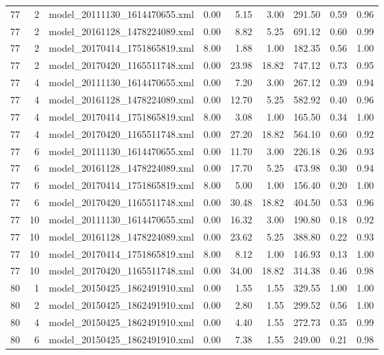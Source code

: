 \begin{table}[ht]
\begin{tabular}{rrlrrrrrr}
   77 &   2 & model\_20111130\_1614470655.xml & 0.00 & 5.15 & 3.00 & 291.50 & 0.59 & 0.96 \\ 
   77 &   2 & model\_20161128\_1478224089.xml & 0.00 & 8.82 & 5.25 & 691.12 & 0.60 & 0.99 \\ 
   77 &   2 & model\_20170414\_1751865819.xml & 8.00 & 1.88 & 1.00 & 182.35 & 0.56 & 1.00 \\ 
   77 &   2 & model\_20170420\_1165511748.xml & 0.00 & 23.98 & 18.82 & 747.12 & 0.73 & 0.95 \\ 
   77 &   4 & model\_20111130\_1614470655.xml & 0.00 & 7.20 & 3.00 & 267.12 & 0.39 & 0.94 \\ 
   77 &   4 & model\_20161128\_1478224089.xml & 0.00 & 12.70 & 5.25 & 582.92 & 0.40 & 0.96 \\ 
   77 &   4 & model\_20170414\_1751865819.xml & 8.00 & 3.08 & 1.00 & 165.50 & 0.34 & 1.00 \\ 
   77 &   4 & model\_20170420\_1165511748.xml & 0.00 & 27.20 & 18.82 & 564.10 & 0.60 & 0.92 \\ 
   77 &   6 & model\_20111130\_1614470655.xml & 0.00 & 11.70 & 3.00 & 226.18 & 0.26 & 0.93 \\ 
   77 &   6 & model\_20161128\_1478224089.xml & 0.00 & 17.70 & 5.25 & 473.98 & 0.30 & 0.94 \\ 
   77 &   6 & model\_20170414\_1751865819.xml & 8.00 & 5.00 & 1.00 & 156.40 & 0.20 & 1.00 \\ 
   77 &   6 & model\_20170420\_1165511748.xml & 0.00 & 30.48 & 18.82 & 404.50 & 0.53 & 0.96 \\ 
   77 &  10 & model\_20111130\_1614470655.xml & 0.00 & 16.32 & 3.00 & 190.80 & 0.18 & 0.92 \\ 
   77 &  10 & model\_20161128\_1478224089.xml & 0.00 & 23.62 & 5.25 & 388.80 & 0.22 & 0.93 \\ 
   77 &  10 & model\_20170414\_1751865819.xml & 8.00 & 8.12 & 1.00 & 146.93 & 0.13 & 1.00 \\ 
   77 &  10 & model\_20170420\_1165511748.xml & 0.00 & 34.00 & 18.82 & 314.38 & 0.46 & 0.98 \\ 
   80 &   1 & model\_20150425\_1862491910.xml & 0.00 & 1.55 & 1.55 & 329.55 & 1.00 & 1.00 \\ 
   80 &   2 & model\_20150425\_1862491910.xml & 0.00 & 2.80 & 1.55 & 299.52 & 0.56 & 1.00 \\ 
   80 &   4 & model\_20150425\_1862491910.xml & 0.00 & 4.40 & 1.55 & 272.73 & 0.35 & 0.99 \\ 
   80 &   6 & model\_20150425\_1862491910.xml & 0.00 & 7.38 & 1.55 & 249.00 & 0.21 & 0.98 \\ 

\end{tabular}
\end{table}
